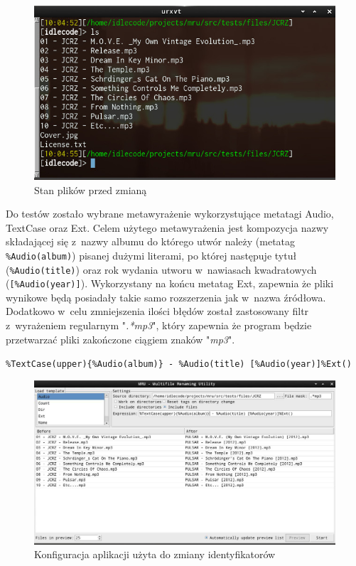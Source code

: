 \begin{figure}[h]
\begin{center}
\includegraphics[scale=0.70]{img/test_before.png}
\end{center}
\caption{Stan plików przed zmianą}
\label{test-before}
\end{figure}

\par
Do testów zostało wybrane metawyrażenie wykorzystujące metatagi Audio, TextCase oraz Ext.
Celem użytego metawyrażenia jest kompozycja nazwy składającej się z~nazwy albumu do którego utwór należy (metatag \texttt{\%Audio(album)}) pisanej dużymi literami, po której następuje tytuł (\texttt{\%Audio(title)}) oraz rok wydania utworu w~nawiasach kwadratowych (\texttt{[\%Audio(year)]}). Wykorzystany na końcu metatag Ext, zapewnia że pliki wynikowe będą posiadały takie samo rozszerzenia jak w~nazwa źródłowa.\\
Dodatkowo w~celu zmniejszenia ilości błędów został zastosowany filtr z~wyrażeniem regularnym "\textit{.*mp3}", który zapewnia że program będzie przetwarzać pliki zakończone ciągiem znaków "\textit{mp3}".

\begin{center}
\texttt{\%TextCase(upper)\{\%Audio(album)\} - \%Audio(title) [\%Audio(year)]\%Ext()}
\end{center}

\begin{figure}[h]
\begin{center}
\includegraphics[scale=0.45]{img/test_window.png}
\end{center}
\caption{Konfiguracja aplikacji użyta do zmiany identyfikatorów}
\end{figure}

